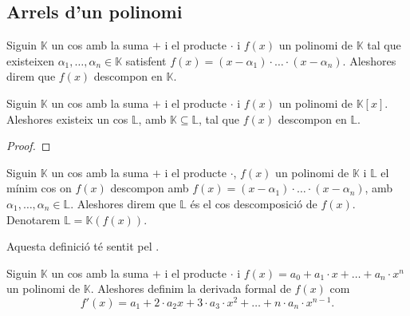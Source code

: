 \documentclass[../Apunts.tex]{subfiles}
\begin{document}
	\subsection{Arrels d'un polinomi}
	\begin{definition}
		\label{def:descomposició d'un polinomi}
		Siguin \(\mathbb{K}\) un cos amb la suma \(+\) i el producte \(\cdot\) i \(f(x)\) un polinomi de \(\mathbb{K}\) tal que existeixen \(\alpha_{1},\dots,\alpha_{n}\in\mathbb{K}\) satisfent \(f(x)=(x-\alpha_{1})\cdot\ldots\cdot(x-\alpha_{n})\). Aleshores direm que \(f(x)\) descompon en \(\mathbb{K}\).
	\end{definition}
	\begin{theorem}
		\label{thm:Teorema de Kronecker}
		Siguin \(\mathbb{K}\) un cos amb la suma \(+\) i el producte \(\cdot\) i \(f(x)\) un polinomi de \(\mathbb{K}[x]\). Aleshores existeix un cos \(\mathbb{L}\), amb \(\mathbb{K}\subseteq\mathbb{L}\), tal que \(f(x)\) descompon en \(\mathbb{L}\).
		\begin{proof}
		\end{proof}
	\end{theorem}
	\begin{definition}
		\label{def:cos de descomposició d'un polinomi}
		Siguin \(\mathbb{K}\) un cos amb la suma \(+\) i el producte \(\cdot\), \(f(x)\) un polinomi de \(\mathbb{K}\) i \(\mathbb{L}\) el mínim cos on \(f(x)\) descompon amb \(f(x)=(x-\alpha_{1})\cdot\ldots\cdot(x-\alpha_{n})\), amb \(\alpha_{1},\dots,\alpha_{n}\in\mathbb{L}\). Aleshores direm que \(\mathbb{L}\) és el cos descomposició de \(f(x)\). Denotarem \(\mathbb{L}=\mathbb{K}(f(x))\).
		
		Aquesta definició té sentit pel .
	\end{definition}
	\begin{definition}
		\label{def:derivada formal}
		Siguin \(\mathbb{K}\) un cos amb la suma \(+\) i el producte \(\cdot\) i \(f(x)=a_{0}+a_{1}\cdot x+\dots+a_{n}\cdot x^{n}\) un polinomi de \(\mathbb{K}\). Aleshores definim la derivada formal de \(f(x)\) com
		\[f'(x)=a_{1}+2\cdot a_{2}x+3\cdot a_{3}\cdot x^{2}+\dots+n\cdot a_{n}\cdot x^{n-1}.\]
	\end{definition}
\end{document}
